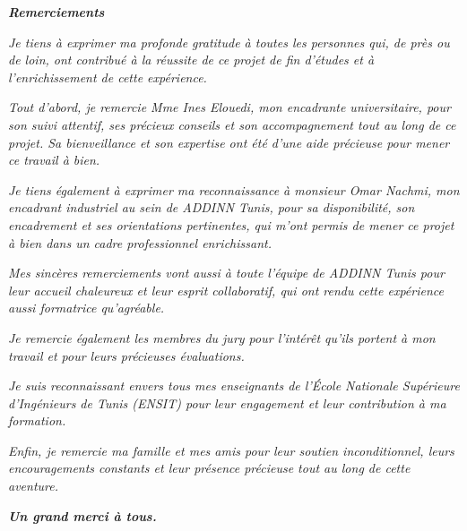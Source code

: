 \begin{center}
    \textbf{\textit{\Huge Remerciements}}\\
\end{center}
\vspace{1cm}
\begin{center}
    \textit{Je tiens à exprimer ma profonde gratitude à toutes les personnes qui, de près ou de loin, ont contribué à la réussite de ce projet de fin d’études et à l’enrichissement de cette expérience.}
    
    \textit{Tout d’abord, je remercie Mme Ines Elouedi, mon encadrante universitaire, pour son suivi attentif, ses précieux conseils et son accompagnement tout au long de ce projet. Sa bienveillance et son expertise ont été d’une aide précieuse pour mener ce travail à bien.}
    
    \textit{Je tiens également à exprimer ma reconnaissance à monsieur Omar Nachmi, mon encadrant industriel au sein de ADDINN Tunis, pour sa disponibilité, son encadrement et ses orientations pertinentes, qui m’ont permis de mener ce projet à bien dans un cadre professionnel enrichissant.}
    
    \textit{Mes sincères remerciements vont aussi à toute l’équipe de ADDINN Tunis pour leur accueil chaleureux et leur esprit collaboratif, qui ont rendu cette expérience aussi formatrice qu’agréable.}
    
    \textit{Je remercie également les membres du jury pour l’intérêt qu’ils portent à mon travail et pour leurs précieuses évaluations.}
    
    \textit{Je suis reconnaissant envers tous mes enseignants de l'École Nationale Supérieure d'Ingénieurs de Tunis (ENSIT) pour leur engagement et leur contribution à ma formation.}
    
    \textit{Enfin, je remercie ma famille et mes amis pour leur soutien inconditionnel, leurs encouragements constants et leur présence précieuse tout au long de cette aventure.}

    \textit{\textbf{Un grand merci à tous.}}

\end{center}
